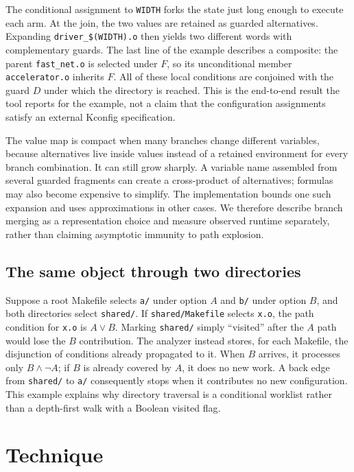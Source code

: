 \documentclass[acmsmall,screen,review]{acmart}
\begin{document}
The conditional assignment to \texttt{WIDTH} forks the state just long enough to execute each arm. At the join, the two values are retained as guarded alternatives. Expanding \texttt{driver\_\$(WIDTH).o} then yields two different words with complementary guards. The last line of the example describes a composite: the parent \texttt{fast\_net.o} is selected under $F$, so its unconditional member \texttt{accelerator.o} inherits $F$. All of these local conditions are conjoined with the guard $D$ under which the directory is reached. This is the end-to-end result the tool reports for the example, not a claim that the configuration assignments satisfy an external Kconfig specification.

The value map is compact when many branches change different variables, because alternatives live inside values instead of a retained environment for every branch combination. It can still grow sharply. A variable name assembled from several guarded fragments can create a cross-product of alternatives; formulas may also become expensive to simplify. The implementation bounds one such expansion and uses approximations in other cases. We therefore describe branch merging as a representation choice and measure observed runtime separately, rather than claiming asymptotic immunity to path explosion.

\subsection{The same object through two directories}
\label{sec:overview:directories}
Suppose a root Makefile selects \texttt{a/} under option $A$ and \texttt{b/} under option $B$, and both directories select \texttt{shared/}. If \texttt{shared/Makefile} selects \texttt{x.o}, the path condition for \texttt{x.o} is $A\lor B$. Marking \texttt{shared/} simply ``visited'' after the $A$ path would lose the $B$ contribution. The analyzer instead stores, for each Makefile, the disjunction of conditions already propagated to it. When $B$ arrives, it processes only $B\land\neg A$; if $B$ is already covered by $A$, it does no new work. A back edge from \texttt{shared/} to \texttt{a/} consequently stops when it contributes no new configuration. This example explains why directory traversal is a conditional worklist rather than a depth-first walk with a Boolean visited flag.

\section{Technique}
\label{sec:design}
\end{document}
